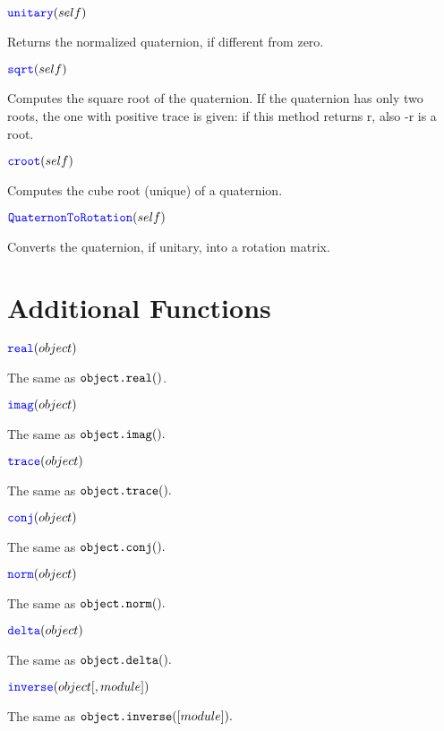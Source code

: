 \documentclass[11pt]{paper}
\begin{document}
\medskip
\noindent $\textcolor{blue}{\texttt{\mbox{unitary}}}(self)$ 

Returns the normalized quaternion, if different from zero.

\medskip
\noindent $\textcolor{blue}{\texttt{\mbox{sqrt}}}(self)$ 

Computes the square root of the quaternion. If the quaternion has only two roots, the one with positive trace is given: if this method returns r, also -r is a root.

\medskip
\noindent $\textcolor{blue}{\texttt{\mbox{croot}}}(self)$ 

Computes the cube root (unique) of a quaternion.

\medskip
\noindent $\textcolor{blue}{\texttt{\mbox{QuaternonToRotation}}}(self)$ 

Converts the quaternion, if unitary, into a rotation matrix.

\bigskip

\section{Additional Functions}

\noindent $\textcolor{blue}{\texttt{\mbox{real}}}(object)$ 

The same as $\texttt{\mbox{object.real}}()$.

\medskip
\noindent $\textcolor{blue}{\texttt{\mbox{imag}}}(object)$ 

The same as $\texttt{\mbox{object.imag}}().$

\medskip
\noindent $\textcolor{blue}{\texttt{\mbox{trace}}}(object)$ 

The same as $\texttt{\mbox{object.trace}}().$

\medskip
\noindent $\textcolor{blue}{\texttt{\mbox{conj}}}(object)$ 

The same as $\texttt{\mbox{object.conj}}().$

\medskip
\noindent $\textcolor{blue}{\texttt{\mbox{norm}}}(object)$ 

The same as $\texttt{\mbox{object.norm}}().$

\medskip
\noindent $\textcolor{blue}{\texttt{\mbox{delta}}}(object)$ 

The same as $\texttt{\mbox{object.delta}}().$

\medskip
\noindent $\textcolor{blue}{\texttt{\mbox{inverse}}}(object[,module])$ 

The same as $\texttt{\mbox{object.inverse}}([module]).$
\end{document}
